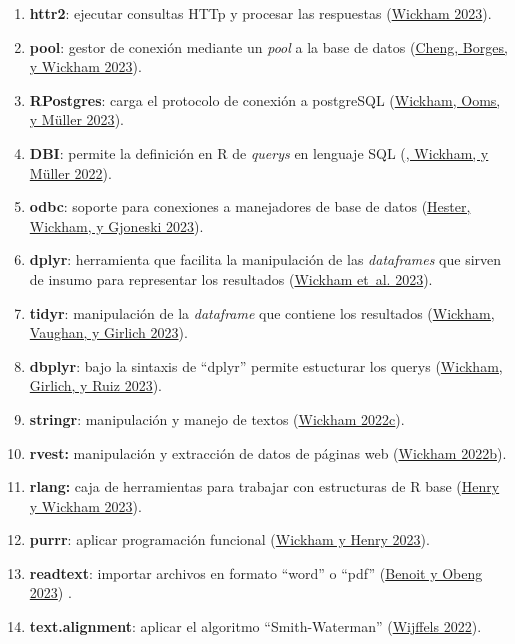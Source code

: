 \documentclass[
  12pt,
  openany]{book}
\begin{document}
\begin{enumerate}
  \begin{enumerate}
  \def\labelenumii{\arabic{enumii}.}
  \item
    \textbf{httr2}: ejecutar consultas HTTp y procesar las respuestas (\protect\hyperlink{ref-httr2}{Wickham 2023}).
  \item
    \textbf{pool}: gestor de conexión mediante un \emph{pool} a la base de datos (\protect\hyperlink{ref-pool}{Cheng, Borges, y Wickham 2023}).
  \item
    \textbf{RPostgres}: carga el protocolo de conexión a postgreSQL (\protect\hyperlink{ref-RPostgres}{Wickham, Ooms, y Müller 2023}).
  \item
    \textbf{DBI}: permite la definición en R de \emph{querys} en lenguaje SQL (\protect\hyperlink{ref-DBI}{, Wickham, y Müller 2022}).
  \item
    \textbf{odbc}: soporte para conexiones a manejadores de base de datos (\protect\hyperlink{ref-odbc}{Hester, Wickham, y Gjoneski 2023}).
  \item
    \textbf{dplyr}: herramienta que facilita la manipulación de las \emph{dataframes} que sirven de insumo para representar los resultados (\protect\hyperlink{ref-dplyr}{Wickham et~al. 2023}).
  \item
    \textbf{tidyr}: manipulación de la \emph{dataframe} que contiene los resultados (\protect\hyperlink{ref-tidyr}{Wickham, Vaughan, y Girlich 2023}).
  \item
    \textbf{dbplyr}: bajo la sintaxis de ``dplyr'' permite estucturar los querys (\protect\hyperlink{ref-dbplyr}{Wickham, Girlich, y Ruiz 2023}).
  \item
    \textbf{stringr}: manipulación y manejo de textos (\protect\hyperlink{ref-stringr}{Wickham 2022c}).
  \item
    \textbf{rvest:} manipulación y extracción de datos de páginas web (\protect\hyperlink{ref-rvest-2}{Wickham 2022b}).
  \item
    \textbf{rlang:} caja de herramientas para trabajar con estructuras de R base (\protect\hyperlink{ref-rlang-2}{Henry y Wickham 2023}).
  \item
    \textbf{purrr}: aplicar programación funcional (\protect\hyperlink{ref-purrr}{Wickham y Henry 2023}).
  \item
    \textbf{readtext}: importar archivos en formato ``word'' o ``pdf'' (\protect\hyperlink{ref-readtext}{Benoit y Obeng 2023}) .
  \item
    \textbf{text.alignment}: aplicar el algoritmo ``Smith-Waterman'' (\protect\hyperlink{ref-text.alignment}{Wijffels 2022}).

\end{enumerate}
\end{enumerate}
\end{document}
